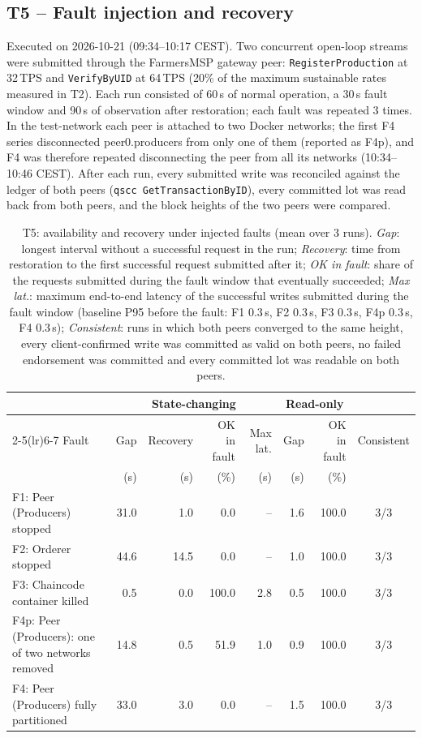 \subsection{T5 -- Fault injection and recovery}
Executed on 2026-10-21 (09:34--10:17 CEST). Two concurrent open-loop
streams were submitted through the FarmersMSP gateway peer: \texttt{RegisterProduction} at 32\,TPS and
\texttt{VerifyByUID} at 64\,TPS (20\% of the maximum sustainable rates measured in T2). Each run consisted of
60\,s of normal operation, a 30\,s fault window and 90\,s of observation after
restoration; each fault was repeated 3 times. In the test-network each peer is attached to two
Docker networks; the first F4 series disconnected peer0.producers from only one of them (reported as F4p), and F4 was therefore
repeated disconnecting the peer from all its networks (10:34--10:46 CEST). After each run, every submitted write was reconciled against the
ledger of both peers (\texttt{qscc GetTransactionByID}), every committed lot was read back from both peers, and the block
heights of the two peers were compared.

\begin{table}[H]
\centering\small
\caption{T5: availability and recovery under injected faults (mean over 3 runs). \emph{Gap}: longest interval
without a successful request in the run; \emph{Recovery}: time from restoration to the first successful request submitted
after it; \emph{OK in fault}: share of the requests submitted during the fault window that eventually
succeeded; \emph{Max lat.}: maximum end-to-end latency of the successful writes submitted during the fault window (baseline P95
before the fault: F1 0.3\,s, F2 0.3\,s, F3 0.3\,s, F4p 0.3\,s, F4 0.3\,s); \emph{Consistent}: runs in which both peers converged to the same height, every client-confirmed write was
committed as valid on both peers, no failed endorsement was committed and every committed lot was readable on both
peers.}
\label{tab:t5}
\setlength{\tabcolsep}{4pt}
\begin{tabular}{lrrrrrrc}
\toprule
 & \multicolumn{4}{c}{State-changing} & \multicolumn{2}{c}{Read-only} & \\
\cmidrule(lr){2-5}\cmidrule(lr){6-7}
Fault & Gap & Recovery & OK in fault & Max lat. & Gap & OK in fault & Consistent \\
 & (s) & (s) & (\%) & (s) & (s) & (\%) & \\
\midrule
F1: Peer (Producers) stopped & 31.0 & 1.0 & 0.0 & -- & 1.6 & 100.0 & 3/3 \\
F2: Orderer stopped & 44.6 & 14.5 & 0.0 & -- & 1.0 & 100.0 & 3/3 \\
F3: Chaincode container killed & 0.5 & 0.0 & 100.0 & 2.8 & 0.5 & 100.0 & 3/3 \\
F4p: Peer (Producers): one of two networks removed & 14.8 & 0.5 & 51.9 & 1.0 & 0.9 & 100.0 & 3/3 \\
F4: Peer (Producers) fully partitioned & 33.0 & 3.0 & 0.0 & -- & 1.5 & 100.0 & 3/3 \\
\bottomrule
\end{tabular}
\end{table}

